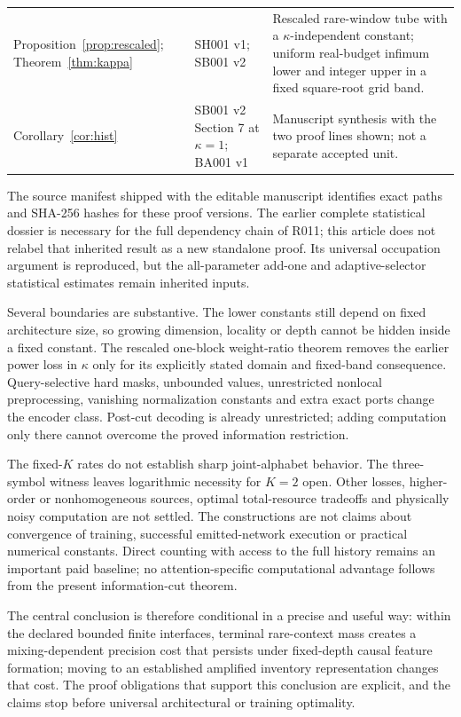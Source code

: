\documentclass[11pt,letterpaper]{article}
\theoremstyle{definition}\newtheorem{definition}[theorem]{Definition}
\theoremstyle{remark}\newtheorem{remark}[theorem]{Remark}
\newcommand{\unit}[1]{\textsf{#1}}
\begin{document}
\begin{center}
\begin{longtable}{@{}>{\raggedright\arraybackslash}p{}>{\raggedright\arraybackslash}p{}>{\raggedright\arraybackslash}p{}@{}}
Proposition~\ref{prop:rescaled}; Theorem~\ref{thm:kappa} & \unit{SH001 v1}; \unit{SB001 v2} & Rescaled rare-window tube with a $\kappa$-independent constant; uniform real-budget infimum lower and integer upper in a fixed square-root grid band.\\[4pt]
Corollary~\ref{cor:hist} & \unit{SB001 v2} Section 7 at $\kappa=1$; \unit{BA001 v1} & Manuscript synthesis with the two proof lines shown; not a separate accepted unit.\\
\bottomrule
\end{longtable}
\end{center}

The source manifest shipped with the editable manuscript identifies exact paths and SHA-256 hashes for these proof versions. The earlier complete statistical dossier is necessary for the full dependency chain of \unit{R011}; this article does not relabel that inherited result as a new standalone proof. Its universal occupation argument is reproduced, but the all-parameter add-one and adaptive-selector statistical estimates remain inherited inputs.

Several boundaries are substantive. The lower constants still depend on fixed architecture size, so growing dimension, locality or depth cannot be hidden inside a fixed constant. The rescaled one-block weight-ratio theorem removes the earlier power loss in $\kappa$ only for its explicitly stated domain and fixed-band consequence. Query-selective hard masks, unbounded values, unrestricted nonlocal preprocessing, vanishing normalization constants and extra exact ports change the encoder class. Post-cut decoding is already unrestricted; adding computation only there cannot overcome the proved information restriction.

The fixed-$K$ rates do not establish sharp joint-alphabet behavior. The three-symbol witness leaves logarithmic necessity for $K=2$ open. Other losses, higher-order or nonhomogeneous sources, optimal total-resource tradeoffs and physically noisy computation are not settled. The constructions are not claims about convergence of training, successful emitted-network execution or practical numerical constants. Direct counting with access to the full history remains an important paid baseline; no attention-specific computational advantage follows from the present information-cut theorem.

The central conclusion is therefore conditional in a precise and useful way: within the declared bounded finite interfaces, terminal rare-context mass creates a mixing-dependent precision cost that persists under fixed-depth causal feature formation; moving to an established amplified inventory representation changes that cost. The proof obligations that support this conclusion are explicit, and the claims stop before universal architectural or training optimality.

\begingroup
\small
\setlength{\bibsep}{4pt}


\endgroup
\end{document}
